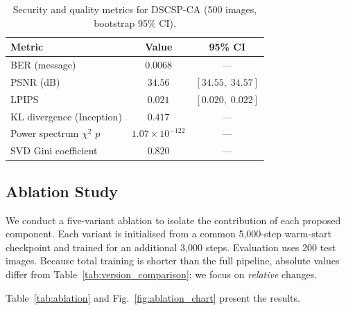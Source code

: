 \documentclass[journal]{IEEEtran}
\begin{document}
\begin{table}[t]
\centering
\caption{Security and quality metrics for DSCSP-CA (500 images, bootstrap 95\% CI).}
\label{tab:security}
\small
\begin{tabular}{@{}lcc@{}}
\toprule
\textbf{Metric} & \textbf{Value} & \textbf{95\% CI} \\
\midrule
BER (message)               & $0.0068$  & --- \\
PSNR (dB)                   & $34.56$   & $[34.55,\;34.57]$ \\
LPIPS                       & $0.021$   & $[0.020,\;0.022]$ \\
\midrule
KL divergence (Inception)   & $0.417$   & --- \\
Power spectrum $\chi^2$ $p$ & $1.07\!\times\!10^{-122}$ & --- \\
SVD Gini coefficient        & $0.820$   & --- \\
\bottomrule
\end{tabular}
\end{table}

\subsection{Ablation Study}
\label{sec:ablation}

We conduct a five-variant ablation to isolate the contribution of each proposed component.
Each variant is initialised from a common 5{,}000-step warm-start checkpoint and trained for
an additional 3{,}000 steps.
Evaluation uses 200 test images.
Because total training is shorter than the full pipeline, absolute values differ from
Table~\ref{tab:version_comparison}; we focus on \emph{relative} changes.

Table~\ref{tab:ablation} and Fig.~\ref{fig:ablation_chart} present the results.
\end{document}
